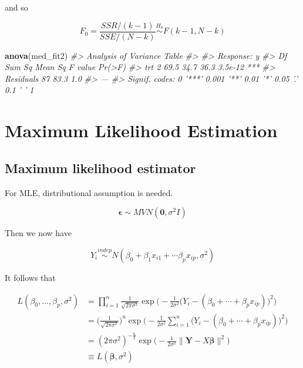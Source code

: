 \documentclass[]{book}
\newenvironment{Shaded}{\begin{snugshade}}{\end{snugshade}}
\newcommand{\CommentTok}[1]{\textcolor[rgb]{0.56,0.35,0.01}{\textit{#1}}}
\newcommand{\KeywordTok}[1]{\textcolor[rgb]{0.13,0.29,0.53}{\textbf{#1}}}
\newcommand{\NormalTok}[1]{#1}
\newcommand{\E}{\boldsymbol\epsilon}
\theoremstyle{definition}
\theoremstyle{definition}
\theoremstyle{definition}
\theoremstyle{remark}
\begin{document}
and so

\[F_0 = \frac{SSR / (k - 1)}{SSE / (N - k)} \stackrel{H_0}{\sim}F(k - 1, N - k)\]

\begin{Shaded}
\begin{Highlighting}[]
\KeywordTok{anova}\NormalTok{(med_fit2)}
\CommentTok{#> Analysis of Variance Table}
\CommentTok{#> }
\CommentTok{#> Response: y}
\CommentTok{#>           Df Sum Sq Mean Sq F value  Pr(>F)    }
\CommentTok{#> trt        2   69.5    34.7    36.3 3.5e-12 ***}
\CommentTok{#> Residuals 87   83.3     1.0                    }
\CommentTok{#> ---}
\CommentTok{#> Signif. codes:  0 '***' 0.001 '**' 0.01 '*' 0.05 '.' 0.1 ' ' 1}
\end{Highlighting}
\end{Shaded}

\hypertarget{maximum-likelihood-estimation-1}{%
\section{Maximum Likelihood Estimation}\label{maximum-likelihood-estimation-1}}

\hypertarget{maximum-likelihood-estimator}{%
\subsection{Maximum likelihood estimator}\label{maximum-likelihood-estimator}}

For MLE, distributional assumption is needed.

\begin{equation}
  \E \sim MVN(\mathbf{0}, \sigma^2 I)
  \label{eq:epsnormal}
\end{equation}

Then we now have

\begin{equation}
  Y_i \stackrel{indep}{\sim}N(\beta_0 + \beta_1 x_{i1} + \cdots \beta_p x_{ip}, \sigma^2)
  \label{eq:ynormal}
\end{equation}

It follows that

\begin{equation}
  \begin{split}
    L(\beta_0, \ldots, \beta_p, \sigma^2) & = \prod_{i = 1}^n \frac{1}{\sqrt{2 \pi \sigma^2}} \exp \bigg( -\frac{1}{2\sigma^2} \Big(Y_i - (\beta_0 + \cdots + \beta_p x_{ip})\Big)^2 \bigg) \\
    & = \bigg( \frac{1}{\sqrt{2 \pi \sigma^2}} \bigg)^n \exp \bigg( -\frac{1}{2\sigma^2} \sum_{i = 1}^n \Big(Y_i - (\beta_0 + \cdots + \beta_p x_{ip})\Big)^2 \bigg) \\
    & = (2 \pi \sigma^2)^{-\frac{n}{2}} \exp\Big( -\frac{1}{2\sigma^2} \lVert \mathbf{Y} - X \boldsymbol\beta\rVert^2 \Big) \\
    & \equiv L(\boldsymbol\beta, \sigma^2)
  \end{split}
  \label{eq:multlike}
\end{equation}
\end{document}
